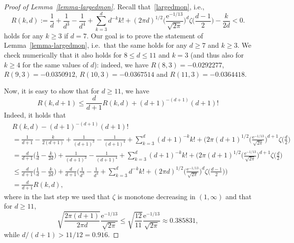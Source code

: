 \documentclass{article}
\newcommand{\e}{\mathrm e}
\theoremstyle{definition}
\newcommand{\1}{\mathbbm{1}}
\newcommand{\0}{\mathbf{o}}
\begin{document}
\begin{proof}[Proof of Lemma~\ref{lemma-largedmon}]
Recall that~\eqref{largedmon}, i.e.,
\[ R(k,d):=\frac{1}{d} + \frac{1}{d^3} -\frac{1}{d^4} + \sum_{k=3}^d d^{-k} k! +  (2\pi d)^{1/2} \Big( \frac{\e^{-1/13}}{\sqrt{2\pi}} \Big)^d \zeta\Big( \frac{d-1}{2} \Big) - \frac{k}{2d} < 0.  \]
holds for any $k\geq 3$ if $d=7$. 
Our goal is to prove the statement of Lemma~\ref{lemma-largedmon}, i.e.\ that the same holds for any $d \geq 7$ and $k\geq 3$. We check numerically that it also holds for $8 \leq d \leq 11$ and $k=3$ (and thus also for $k\geq 4$ for the same values of $d$): indeed, we have $R(8,3)=-0.0292277$, $R(9,3)=-0.0350912$, $R(10,3)=-0.0367514$ and $R(11,3)=-0.0364418$. 

Now, it is easy to show that for $d \geq 11$, we have
\begin{equation}\label{Rfactor} R(k,d+1) \leq \frac{d}{d+1} R(k,d) + (d+1)^{-(d+1)} (d+1)! \end{equation}
Indeed, it holds that
\[ 
\begin{aligned}
   & R(k,d)-(d+1)^{-(d+1)}(d+1)! \\ &=\frac{1}{d+1}- \frac{k}{2(d+1)} + \frac{1}{(d+1)^3} -\frac{1}{(d+1)^4} + \sum_{k=3}^{d} (d+1)^{-k} k! +  (2\pi (d+1)^{1/2} \Big( \frac{\e^{-1/13}}{\sqrt{2\pi}} \Big)^{d+1} \zeta\Big( \frac{d}{2} \Big)
\\    &=\frac{d}{d+1} \Big( \frac{1}{d}- \frac{k}{2d} \Big) + \frac{1}{(d+1)^3} -\frac{1}{(d+1)^4} + \sum_{k=3}^{d} (d+1)^{-k} k! +  (2\pi (d+1)^{1/2} \Big( \frac{\e^{-1/13}}{\sqrt{2\pi}} \Big)^{d+1} \zeta\Big( \frac{d}{2} \Big)
\\ & \leq \frac{d}{d+1} \Big( \frac{1}{d}- \frac{k}{2d} \Big) + \frac{d}{d+1} \Big( \frac{1}{d^3} -\frac{1}{d^4} + \sum_{k=3}^d d^{-k} k! +  (2\pi d)^{1/2} \Big( \frac{\e^{-1/13}}{\sqrt{2\pi}} \Big)^d \zeta\Big( \frac{d-1}{2} \Big) \Big) \\ &=\frac{d}{d+1} R(k,d),
\end{aligned}  \]
where in the last step we used that $\zeta$ is monotone decreasing in $(1,\infty)$ and that for $d \geq 11$,
\begin{equation*} \sqrt{\frac{2\pi(d+1)}{2\pi d}} \frac{\e^{-1/13}}{\sqrt{2\pi}} \leq \sqrt{\frac{12}{11}} \frac{\e^{-1/13}}{\sqrt{2\pi}}  \approx 0.385831, \end{equation*}
while $d/(d+1)>11/12 = 0.91\dot{6}$. 


\end{proof}
\end{document}

